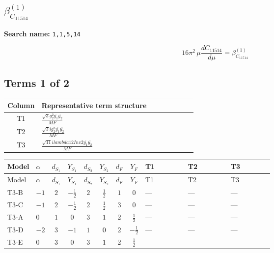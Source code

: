 \documentclass[8pt]{article}
\begin{document}
\begin{landscape}
\section*{$\beta_{C_{11514}}^{(1)}$}
\noindent\textbf{Search name: }\texttt{1,1,5,14}\par\smallskip
\[16\pi^2\,\mu\frac{d C_{11514}}{d\mu}=\beta_{C_{11514}}^{(1)}\]
\subsection*{Terms 1 of 2}
\begin{center}
\begin{tabular}{@{}c >{\raggedright\arraybackslash}p{0.82\linewidth}@{}}
\toprule
Column & Representative term structure \\
\midrule
T1 & \(\displaystyle \frac{\sqrt{3} g_{2}^{2} \overline{y_{1}} \overline{y_{2}}}{MF}\) \\
\midrule
T2 & \(\displaystyle \frac{\sqrt{3} i g_{2}^{2} \overline{y_{1}} \overline{y_{2}}}{MF}\) \\
\midrule
T3 & \(\displaystyle \frac{\sqrt{11} i lambda12Inv2 \overline{y_{1}} \overline{y_{2}}}{MF}\) \\
\midrule
\bottomrule
\end{tabular}
\end{center}
\smallskip
\tiny
\begin{longtable}{@{}llcccccc >{\raggedright\arraybackslash}p{0.21\linewidth} >{\raggedright\arraybackslash}p{0.21\linewidth} >{\raggedright\arraybackslash}p{0.21\linewidth}@{}}
\toprule
Model & $\alpha$ & $d_{S_1}$ & $Y_{S_1}$ & $d_{S_2}$ & $Y_{S_2}$ & $d_F$ & $Y_F$ & T1 & T2 & T3 \\
\midrule
\endfirsthead
\toprule
Model & $\alpha$ & $d_{S_1}$ & $Y_{S_1}$ & $d_{S_2}$ & $Y_{S_2}$ & $d_F$ & $Y_F$ & T1 & T2 & T3 \\
\midrule
\endhead
T3-B & $-1$ & $2$ & $-\frac{1}{2}$ & $2$ & $\frac{1}{2}$ & $1$ & $0$ & --- & --- & --- \\
\midrule
T3-C & $-1$ & $2$ & $-\frac{1}{2}$ & $2$ & $\frac{1}{2}$ & $3$ & $0$ & --- & --- & --- \\
\midrule
T3-A & $0$ & $1$ & $0$ & $3$ & $1$ & $2$ & $\frac{1}{2}$ & --- & --- & --- \\
\midrule
T3-D & $-2$ & $3$ & $-1$ & $1$ & $0$ & $2$ & $-\frac{1}{2}$ & --- & --- & --- \\
\midrule
T3-E & $0$ & $3$ & $0$ & $3$ & $1$ & $2$ & $\frac{1}{2}$ & \scriptsize\adjustbox{max width=\linewidth}{$\begin{gathered} \frac{\sqrt{3} g_{2}^{2} \overline{y_{1}} \overline{y_{2}}}{6 MF}\end{gathered}$} & \scriptsize\adjustbox{max width=\linewidth}{$\begin{gathered} - \frac{11 \sqrt{3} i g_{2}^{2} \overline{y_{1}} \overline{y_{2}}}{8 MF}\end{gathered}$} & \scriptsize\adjustbox{max width=\linewidth}{$\begin{gathered} - \frac{3 \sqrt{11} i lambda12Inv2 \overline{y_{1}} \overline{y_{2}}}{22 MF}\end{gathered}$} \\

\end{longtable}
\end{landscape}
\end{document}
